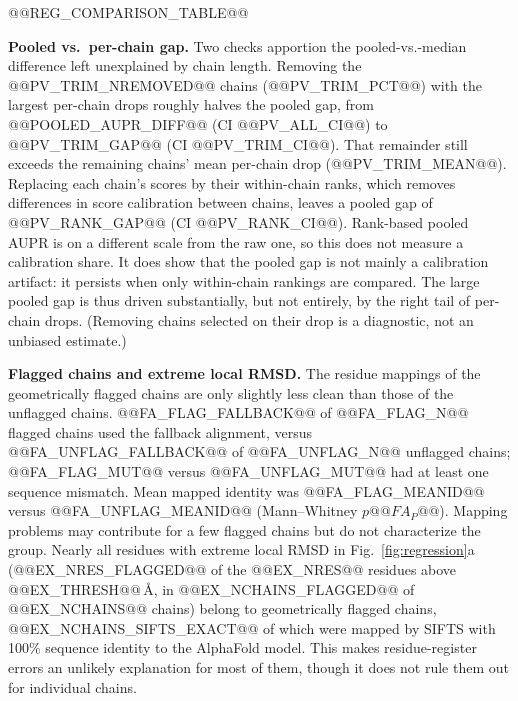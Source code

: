 \documentclass[10pt]{article}
\begin{document}
\begin{table}[t]
\centering
\small
@@REG_COMPARISON_TABLE@@
\caption{Post-hoc. The regression design of Table~\ref{tab:regression}
(same @@REG_N@@ residues, cluster-robust standard errors by chain) with the
pre-specified outcome (left) and the signed error (right; positive when the
AlphaFold-input prediction is further from the true label $y$).}
\label{tab:regcompare}
\end{table}

\textbf{Pooled vs.\ per-chain gap.} Two checks apportion the
pooled-vs.-median difference left unexplained by chain length. Removing the @@PV_TRIM_NREMOVED@@ chains
(@@PV_TRIM_PCT@@) with the largest per-chain drops roughly halves the pooled
gap, from @@POOLED_AUPR_DIFF@@ (CI @@PV_ALL_CI@@) to @@PV_TRIM_GAP@@ (CI
@@PV_TRIM_CI@@). That remainder still exceeds the remaining chains' mean
per-chain drop (@@PV_TRIM_MEAN@@). Replacing each chain's scores by their
within-chain ranks, which removes differences in score calibration between
chains, leaves a pooled gap of @@PV_RANK_GAP@@ (CI @@PV_RANK_CI@@). Rank-based
pooled AUPR is on a different scale from the raw one, so this does not
measure a calibration share. It does show that the pooled gap is not mainly
a calibration artifact: it persists when only within-chain rankings are
compared. The large pooled gap is thus driven substantially, but not
entirely, by the right tail of per-chain drops. (Removing chains selected
on their drop is a diagnostic, not an unbiased estimate.)

\textbf{Flagged chains and extreme local RMSD.} The residue mappings of
the geometrically flagged chains are only slightly less clean than those
of the unflagged chains. @@FA_FLAG_FALLBACK@@ of
@@FA_FLAG_N@@ flagged chains used the fallback alignment, versus
@@FA_UNFLAG_FALLBACK@@ of @@FA_UNFLAG_N@@ unflagged chains;
@@FA_FLAG_MUT@@ versus @@FA_UNFLAG_MUT@@ had at least one sequence mismatch.
Mean mapped identity was @@FA_FLAG_MEANID@@ versus @@FA_UNFLAG_MEANID@@
(Mann--Whitney $p @@FA_P@@$). Mapping problems may contribute for a few
flagged chains but do not characterize the group. Nearly all residues with extreme local RMSD in
Fig.~\ref{fig:regression}a
(@@EX_NRES_FLAGGED@@ of the @@EX_NRES@@ residues above @@EX_THRESH@@\,\r{A},
in @@EX_NCHAINS_FLAGGED@@ of @@EX_NCHAINS@@ chains) belong to geometrically
flagged chains, @@EX_NCHAINS_SIFTS_EXACT@@ of which were mapped by SIFTS with
100\% sequence identity to the AlphaFold model. This makes residue-register
errors an unlikely explanation for most of them, though it does not rule
them out for individual chains.
\end{document}
